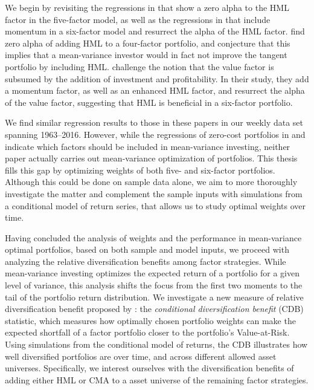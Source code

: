 We begin by revisiting the regressions in \textcite{FF2015} that show a zero alpha to the HML factor in the five-factor model, as well as the regressions in \textcite{Asness2015} that include momentum in a six-factor model and resurrect the alpha of the HML factor. \textcite{FF2015} find zero alpha of adding HML to a four-factor portfolio, and conjecture that this implies that a mean-variance investor would in fact not improve the tangent portfolio by including HML. \textcite{Asness2015} challenge the notion that the value factor is subsumed by the addition of investment and profitability. In their study, they add a momentum factor, as well as an enhanced HML factor, and resurrect the alpha of the value factor, suggesting that HML is beneficial in a six-factor portfolio.

We find similar regression results to those in these papers in our weekly data set spanning 1963--2016. However, while the regressions of zero-cost portfolios in \textcite{FF2015} and \textcite{Asness2015} indicate which factors should be included in mean-variance investing, neither paper actually carries out mean-variance optimization of portfolios. This thesis fills this gap by optimizing weights of both five- and six-factor portfolios. Although this could be done on sample data alone, we aim to more thoroughly investigate the matter and complement the sample inputs with simulations from a conditional model of return series, that allows us to study optimal weights over time.

Having concluded the analysis of weights and the performance in mean-variance optimal portfolios, based on both sample and model inputs, we proceed with analyzing the relative diversification benefits among factor strategies. While mean-variance investing optimizes the expected return of a portfolio for a given level of variance, this analysis shifts the focus from the first two moments to the tail of the portfolio return distribution. We investigate a new measure of relative diversification benefit proposed by \textcite{ChristoffersenErrunzaJacobLanglois2012}: the \emph{conditional diversification benefit} (CDB) statistic, which measures how optimally chosen portfolio weights can make the expected shortfall of a factor portfolio closer to the portfolio's Value-at-Risk. Using simulations from the conditional model of returns, the CDB illustrates how well diversified portfolios are over time, and across different allowed asset universes. Specifically, we interest ourselves with the diversification benefits of adding either HML or CMA to a asset universe of the remaining factor strategies.

